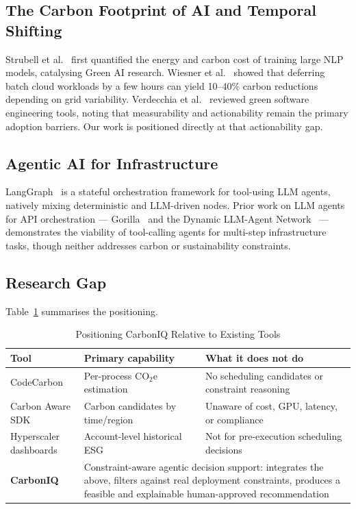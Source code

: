 ﻿\documentclass[conference]{IEEEtran}
\begin{document}
\subsection{The Carbon Footprint of AI and Temporal Shifting}

Strubell et al.~\cite{strubell2019energy} first quantified the energy and carbon cost
of training large NLP models, catalysing Green AI research.
Wiesner et al.~\cite{wiesner2021lets} showed that deferring batch cloud workloads by
a few hours can yield 10--40\% carbon reductions depending on grid variability.
Verdecchia et al.~\cite{verdecchia2023greensoftware} reviewed green software
engineering tools, noting that measurability and actionability remain the primary
adoption barriers.
Our work is positioned directly at that actionability gap.

\subsection{Agentic AI for Infrastructure}

LangGraph~\cite{langgraph_docs} is a stateful orchestration framework for
tool-using LLM agents, natively mixing deterministic and LLM-driven nodes.
Prior work on LLM agents for API orchestration --- Gorilla~\cite{patil2023gorilla} and
the Dynamic LLM-Agent Network~\cite{liu2023dynamic} --- demonstrates the viability of
tool-calling agents for multi-step infrastructure tasks, though neither addresses carbon
or sustainability constraints.

\subsection{Research Gap}

Table~\ref{tab:gap} summarises the positioning.

\begin{table}[htbp]
\caption{Positioning CarbonIQ Relative to Existing Tools}
\label{tab:gap}
\centering
\begin{tabular}{p{1.5cm}p{2.4cm}p{3.3cm}}
\toprule
\textbf{Tool} & \textbf{Primary capability} & \textbf{What it does not do}\\
\midrule
CodeCarbon & Per-process CO$_2$e estimation & No scheduling candidates or constraint reasoning\\[2pt]
Carbon Aware SDK & Carbon candidates by time/region & Unaware of cost, GPU, latency, or compliance\\[2pt]
Hyperscaler dashboards & Account-level historical ESG & Not for pre-execution scheduling decisions\\[2pt]
\textbf{CarbonIQ} & \multicolumn{2}{p{5.7cm}}{Constraint-aware agentic decision support: integrates the above, filters against real deployment constraints, produces a feasible and explainable human-approved recommendation}\\
\bottomrule
\end{tabular}
\end{table}
\end{document}
